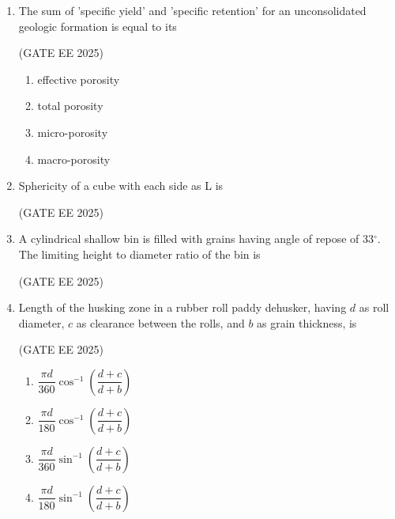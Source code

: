 \documentclass[journal,12pt,onecolumn]{IEEEtran}
\theoremstyle{remark}
\begin{document}
\begin{enumerate}
\hfill(GATE EE 2025)

\begin{multicols}{2}
\begin{enumerate}
    \item homogeneous soils
    \item anisotropic soils
    \item heavy clay soils only
    \item layered soils
\end{enumerate}
\end{multicols}

\item The sum of 'specific yield' and 'specific retention' for an unconsolidated geologic formation is equal to its

\hfill(GATE EE 2025)

\begin{multicols}{4}
\begin{enumerate}
    \item effective porosity
    \item total porosity
    \item micro-porosity
    \item macro-porosity
\end{enumerate}
 \end{multicols}

\item Sphericity of a cube with each side as L is \underline{\hspace{2cm}}

\hfill(GATE EE 2025)

\item A cylindrical shallow bin is filled with grains having angle of repose of 33$^{\circ}$. The limiting height to diameter ratio of the bin is \underline{\hspace{2cm}}

\hfill(GATE EE 2025)

\item Length of the husking zone in a rubber roll paddy dehusker, having $d$ as roll diameter, $c$ as clearance between the rolls, and $b$ as grain thickness, is  

\hfill(GATE EE 2025)

\begin{multicols}{2}
\begin{enumerate}
\item $\dfrac{\pi d}{360} \cos^{-1}\!\left(\dfrac{d+c}{d+b}\right)$  
\item $\dfrac{\pi d}{180} \cos^{-1}\!\left(\dfrac{d+c}{d+b}\right)$  
\item $\dfrac{\pi d}{360} \sin^{-1}\!\left(\dfrac{d+c}{d+b}\right)$  
\item $\dfrac{\pi d}{180} \sin^{-1}\!\left(\dfrac{d+c}{d+b}\right)$  
\end{enumerate}
\end{multicols}


\end{enumerate}
\end{document}
